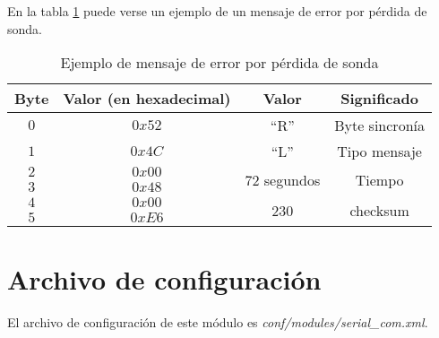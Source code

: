 En la tabla \ref{tab19} puede verse un ejemplo de un mensaje de error por pérdida de sonda.

\begin{table}[h]
	\centering
	\caption{Ejemplo de mensaje de error por pérdida de sonda}
	\begin{tabular}{|c|c|c|c|}\hline
		\textbf{Byte} 	&	\textbf{Valor (en hexadecimal)}	&\textbf{Valor}	&\textbf{Significado} \\ \hline \hline
		$0$ 			&  $0x52$			& ``R''		& Byte sincronía	\\ \hline
		$1$				&  $0x4C$			& ``L''		& Tipo mensaje		\\ \hline
		$2$				&  $0x00$			& \multirow{2}{*}{$72$ segundos} & \multirow{2}{*}{Tiempo} \\
		$3$				&  $0x48$			&  & \\ \hline	
		$4$				&  $0x00$			&  \multirow{2}{*}{230}	& \multirow{2}{*}{checksum} \\
		$5$				&  $0xE6$			&     &     \\ \hline	
		
		
	\end{tabular}
	\label{tab19}
\end{table}


\section{Archivo de configuración}\label{sec:2}

El archivo de configuración de este módulo es \textit{conf/modules/serial\_com.xml}.

